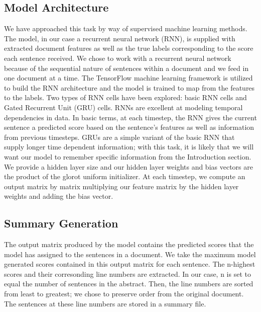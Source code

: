 \documentclass[11pt]{article}
\begin{document}
	\subsection{Model Architecture} 
		We have approached this task by way of supervised machine learning methods. The model, in our case a recurrent neural network (RNN), is supplied with extracted document features as well as the true labels corresponding to the score each sentence received. We chose to work with a recurrent neural network because of the sequential nature of sentences within a document and we feed in one document at a time. The TensorFlow machine learning framework is utilized to build the RNN architecture and the model is trained to map from the features to the labels. Two types of RNN cells have been explored: basic RNN cells and Gated Recurrent Unit (GRU) cells. RNNs are excellent at modeling temporal dependencies in data. In basic terms, at each timestep, the RNN gives the current sentence a predicted score based on the sentence's features as well as information from previous timesteps. GRUs are a simple variant of the basic RNN that supply longer time dependent information; with this task, it is likely that we will want our model to remember specific information from the Introduction section. We provide a hidden layer size and our hidden layer weights and bias vectors are the product of the glorot uniform initializer. At each timestep, we compute an output matrix by matrix multiplying our feature matrix by the hidden layer weights and adding the bias vector. 
	\subsection{Summary Generation}
	The output matrix produced by the model contains the predicted scores that the model has assigned to the sentences in a document. We take the maximum model generated scores contained in this output matrix for each sentence. The n-highest scores and their corresonding line numbers are extracted. In our case, n is set to equal the number of sentences in the abstract. Then, the line numbers are sorted from least to greatest; we chose to preserve order from the original document. The sentences at these line numbers are stored in a summary file.
			
\end{document}
